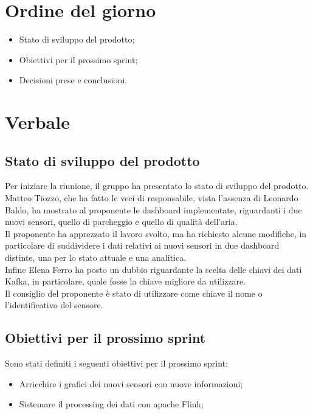 \documentclass[italian,12pt]{article}
\begin{document}
\section{Ordine del giorno}
\begin{itemize}
	\item Stato di sviluppo del prodotto;
	\item Obiettivi per il prossimo sprint;
	\item Decisioni prese e conclusioni.
\end{itemize}

\newpage

\section{Verbale}

\subsection{Stato di sviluppo del prodotto}
Per iniziare la riunione, il gruppo ha presentato lo stato di sviluppo del prodotto.\\
Matteo Tiozzo, che ha fatto le veci di responsabile, vista l'assenza di Leonardo Baldo, ha mostrato al proponente le
dashboard implementate, riguardanti i due nuovi sensori, quello di parcheggio e quello di qualità dell'aria.\\
Il proponente ha apprezzato il lavoro svolto, ma ha richiesto alcune modifiche, in particolare di suddividere
i dati relativi ai nuovi sensori in due dashboard distinte, una per lo stato attuale e una analitica.\\
Infine Elena Ferro ha posto un dubbio riguardante la scelta delle chiavi dei dati Kafka, in particolare, quale fosse
la chiave migliore da utilizzare.\\ Il consiglio del proponente è stato di utilizzare come chiave il nome o
l'identificativo del sensore.

\subsection{Obiettivi per il prossimo sprint}
Sono stati definiti i seguenti obiettivi per il prossimo sprint:
\begin{itemize}
	\item Arricchire i grafici dei nuovi sensori con nuove informazioni;
	\item Sistemare il processing dei dati con apache Flink;
\end{itemize}
\end{document}
